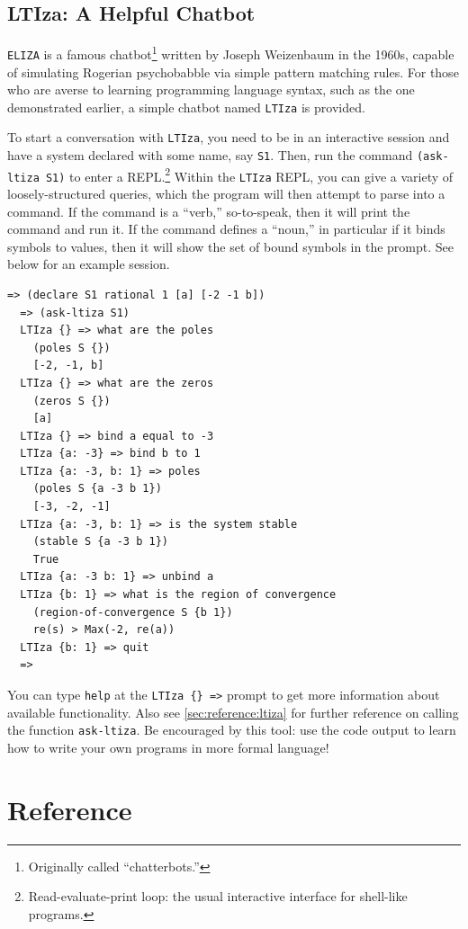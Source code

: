 \documentclass[11pt,letter]{article}
\begin{document}
\newpage

\subsection{LTIza: A Helpful Chatbot}

\lstinline!ELIZA! is a famous chatbot\footnote{Originally called ``chatterbots.''} written by Joseph Weizenbaum in the 1960s, capable of simulating Rogerian psychobabble via simple pattern matching rules.
For those who are averse to learning programming language syntax, such as the one demonstrated earlier, a simple chatbot named \lstinline!LTIza! is provided.

To start a conversation with \lstinline!LTIza!, you need to be in an interactive session and have a system declared with some name, say \lstinline!S1!.
Then, run the command \lstinline!(ask-ltiza S1)! to enter a REPL.\footnote{Read-evaluate-print loop: the usual interactive interface for shell-like programs.}
Within the \lstinline!LTIza! REPL, you can give a variety of loosely-structured queries, which the program will then attempt to parse into a command.
If the command is a ``verb,'' so-to-speak, then it will print the command and run it.
If the command defines a ``noun,'' in particular if it binds symbols to values, then it will show the set of bound symbols in the prompt.
See below for an example session.

\begin{lstlisting}[gobble=2]
  => (declare S1 rational 1 [a] [-2 -1 b])
  => (ask-ltiza S1)
  LTIza {} => what are the poles
    (poles S {})
    [-2, -1, b]
  LTIza {} => what are the zeros
    (zeros S {})
    [a]
  LTIza {} => bind a equal to -3
  LTIza {a: -3} => bind b to 1
  LTIza {a: -3, b: 1} => poles
    (poles S {a -3 b 1})
    [-3, -2, -1]
  LTIza {a: -3, b: 1} => is the system stable
    (stable S {a -3 b 1})
    True
  LTIza {a: -3 b: 1} => unbind a
  LTIza {b: 1} => what is the region of convergence
    (region-of-convergence S {b 1})
    re(s) > Max(-2, re(a))
  LTIza {b: 1} => quit
  =>
\end{lstlisting}

You can type \lstinline!help! at the \lstinline!LTIza {} =>! prompt to get more information about available functionality.
Also see \cref{sec:reference:ltiza} for further reference on calling the function \lstinline!ask-ltiza!.
Be encouraged by this tool: use the code output to learn how to write your own programs in more formal language!

\section{Reference}\label{sec:reference}
\end{document}
